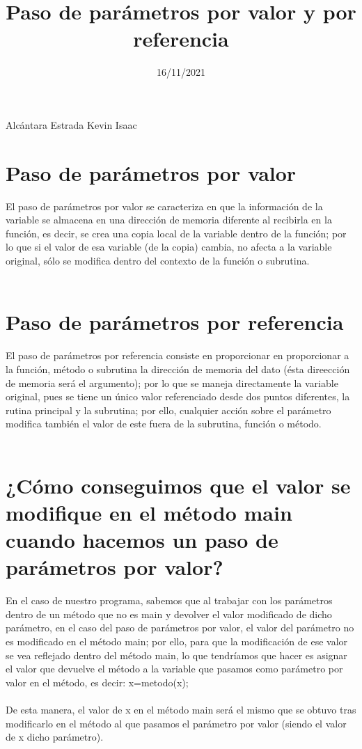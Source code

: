 \documentclass[20pt]{article}
\begin{document}
\title{Paso de parámetros por valor y por referencia}
\date{16/11/2021}
\maketitle

\setlength{\parindent}{0px}

Alcántara Estrada Kevin Isaac\\
\section{Paso de parámetros por valor}
        {\large El paso de parámetros por valor se caracteriza en que la información de la variable se almacena en una dirección de memoria diferente al recibirla en la función, es decir, se crea una copia local de la variable dentro de la función; por lo que si el valor de esa variable (de la copia) cambia, no afecta a la variable original, sólo se modifica dentro del contexto de la función o subrutina.}\\\\

        \section{Paso de parámetros por referencia}
                {\large El paso de parámetros por referencia consiste en proporcionar en proporcionar a la función, método o subrutina la dirección de memoria del dato (ésta direección de memoria será el argumento); por lo que se maneja directamente la variable original, pues se tiene un único valor referenciado desde dos puntos diferentes, la rutina principal y la subrutina; por ello, cualquier acción sobre el parámetro modifica también el valor de este fuera de la subrutina, función o método.}\\\\


                 \section{¿Cómo conseguimos que el valor se modifique en el método main cuando hacemos un paso de parámetros por valor?}
                         {\large En el caso de nuestro programa, sabemos que al trabajar con los parámetros dentro de un método que no es main y devolver el valor modificado de dicho parámetro, en el caso del paso de parámetros por valor, el valor del parámetro no es modificado en el método main; por ello, para que la modificación de ese valor se vea reflejado dentro del método main, lo que tendríamos que hacer es asignar el valor que devuelve el método a la variable que pasamos como parámetro por valor en el método, es decir: x=metodo(x);}\\\\
                         {\large De esta manera, el valor de x en el método main será el mismo que se obtuvo tras modificarlo en el método al que pasamos el parámetro por valor (siendo el valor de x dicho parámetro).}
\end{document}
